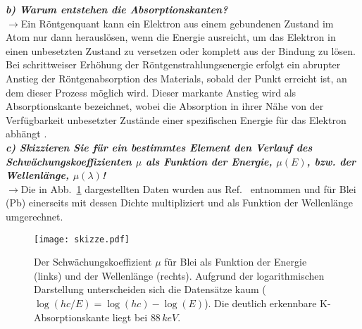 \textbf{\textit{b) Warum entstehen die Absorptionskanten?}}\\
$\rightarrow$Ein Röntgenquant kann ein Elektron aus einem gebundenen Zustand im Atom nur dann herauslösen, 
wenn die Energie ausreicht, um das Elektron in einen unbesetzten Zustand zu versetzen oder komplett aus der Bindung zu lösen. 
Bei schrittweiser Erhöhung der Röntgenstrahlungsenergie erfolgt ein abrupter Anstieg der Röntgenabsorption des Materials, 
sobald der Punkt erreicht ist, an dem dieser Prozess möglich wird. 
Dieser markante Anstieg wird als Absorptionskante bezeichnet, wobei die Absorption in ihrer Nähe von der 
Verfügbarkeit unbesetzter Zustände einer spezifischen Energie für das Elektron abhängt \cite{Demtroder}. \\

\textbf{\textit{c) Skizzieren Sie für ein bestimmtes Element den Verlauf des Schwächungskoeffizienten 
$\mu$ als Funktion der Energie, $\mu(E)$, bzw. der Wellenlänge, $\mu(\lambda)$!}}\\
$\rightarrow$Die in Abb.~\ref{fig:daten} dargestellten Daten wurden aus Ref.~\cite{Tabe} entnommen und für Blei (Pb) einerseits 
mit dessen Dichte multipliziert und als Funktion der Wellenlänge umgerechnet. 
\begin{figure}[h!]
    \centering
    \texttt{[image: skizze.pdf]}
    \caption{\label{fig:daten}Der Schwächungskoeffizient $\mu$ für Blei als Funktion der Energie (links) und der 
    Wellenlänge (rechts). Aufgrund der logarithmischen Darstellung unterscheiden sich die Datensätze kaum ($\log(hc/E)=\log(hc) - \log(E)$).
    Die deutlich erkennbare K-Absorptionskante liegt bei $88\,\si{keV}$.}
\end{figure}\FloatBarrier 